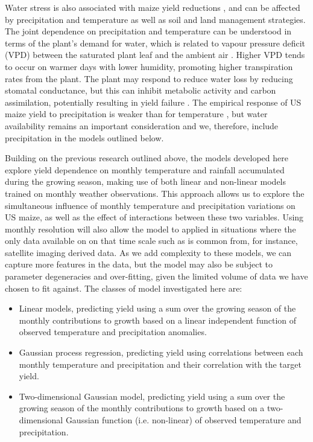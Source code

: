 \documentclass[12pt]{article}
\begin{document}
Water stress is also associated with maize yield reductions \citep[e.g.][and references therein]{cakir:2004, ge:2012, lobell:2013, carter:2016, song:2019}, and can be affected by precipitation and temperature as well as soil and land management strategies. The joint dependence on precipitation and temperature can be understood in terms of the plant's demand for water, which is related to vapour pressure deficit (VPD) between the saturated plant leaf and the ambient air \citep[e.g.][]{roberts:2012, lobell:2013}. Higher VPD tends to occur on warmer days with lower humidity, promoting higher transpiration rates from the plant. The plant may respond to reduce water loss by reducing stomatal conductance, but this can inhibit metabolic activity and carbon assimilation, potentially resulting in yield failure \citep[e.g.][]{song:2010, ge:2012, lobell:2013, song:2019}. The empirical response of US maize yield to precipitation is weaker than for temperature \citep[e.g.][]{lobell:2013}, but water availability remains an important consideration and we, therefore, include precipitation in the models outlined below.

Building on the previous research outlined above, the models developed here explore yield dependence on monthly temperature and rainfall accumulated during the growing season, making use of both linear and non-linear models trained on monthly weather observations. This approach allows us to explore the simultaneous influence of monthly temperature and precipitation variations on US maize, as well as the effect of interactions between these two variables. Using monthly resolution will also allow the model to applied in situations where the only data available on on that time scale such as is common from, for instance, satellite imaging derived data. As we add complexity to these models, we can capture more features in the data, but the model may also be subject to parameter degeneracies and over-fitting, given the limited volume of data we have chosen to fit against. The classes of model investigated here are:

\begin{itemize}
\item Linear models, predicting yield using a sum over the growing season of the monthly contributions to growth based on a linear independent function of observed temperature and precipitation anomalies.
\item Gaussian process regression, predicting yield using correlations between each monthly temperature and precipitation and their correlation with the target yield.
\item Two-dimensional Gaussian model, predicting yield using a sum over the growing season of the monthly contributions to growth based on a two-dimensional Gaussian function (i.e. non-linear) of observed temperature and precipitation.
\end{itemize}
\end{document}
